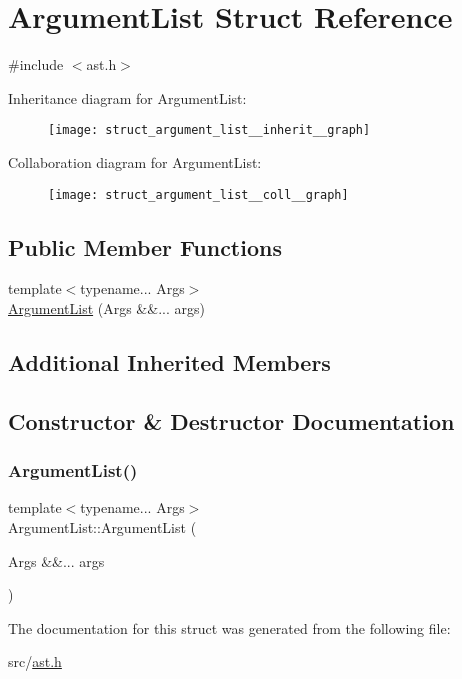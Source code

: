 \hypertarget{struct_argument_list}{}\section{Argument\+List Struct Reference}
\label{struct_argument_list}


{\ttfamily \#include $<$ast.\+h$>$}



Inheritance diagram for Argument\+List\+:
\nopagebreak
\begin{figure}[H]
\begin{center}
\leavevmode
\texttt{[image: struct\_argument\_list\_\_inherit\_\_graph]}
\end{center}
\end{figure}


Collaboration diagram for Argument\+List\+:
\nopagebreak
\begin{figure}[H]
\begin{center}
\leavevmode
\texttt{[image: struct\_argument\_list\_\_coll\_\_graph]}
\end{center}
\end{figure}
\subsection*{Public Member Functions}
\begin{DoxyCompactItemize}
\item 
{\footnotesize template$<$typename... Args$>$ }\\\hyperlink{struct_argument_list_a7df7f5009c8fc56cede100d66e45cb93}{Argument\+List} (Args \&\&... args)
\end{DoxyCompactItemize}
\subsection*{Additional Inherited Members}


\subsection{Constructor \& Destructor Documentation}
\mbox{\label{struct_argument_list_a7df7f5009c8fc56cede100d66e45cb93}} 
\subsubsection{\texorpdfstring{Argument\+List()}{ArgumentList()}}
{\footnotesize\ttfamily template$<$typename... Args$>$ \\
Argument\+List\+::\+Argument\+List (\begin{DoxyParamCaption}\item[{Args \&\&...}]{args }\end{DoxyParamCaption})\hspace{0.3cm}{\ttfamily [inline]}}



The documentation for this struct was generated from the following file\+:\begin{DoxyCompactItemize}
\item 
src/\hyperlink{ast_8h}{ast.\+h}\end{DoxyCompactItemize}
